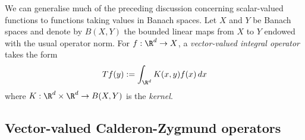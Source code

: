 \documentclass[reqno]{amsart}
\newtheorem{theorem}{Theorem}
\theoremstyle{definition}
\theoremstyle{remark}
\newcounter{problem}[section]	\declaretheorem[style=thmrecbox,name=Problem, numberlike=problem]{statement}
\begin{document}
We can generalise much of the preceding discussion concerning scalar-valued functions to functions taking values in Banach spaces. Let $X$ and $Y$ be Banach spaces and denote by $B(X, Y)$ the bounded linear maps from $X$ to $Y$ endowed with the usual operator norm. For $f : \R^d \to X$, a \textit{vector-valued integral operator} takes the form
	\[ Tf(y) := \int_{\R^d} K(x, y) f(x) \, dx \]
where $K : \R^d \times \R^d \to B(X, Y)$ is the \textit{kernel}. 

\subsection{Vector-valued Calderon-Zygmund operators}
\end{document}
